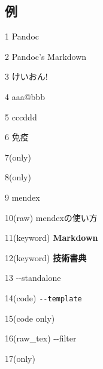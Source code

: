 \documentclass[
  a4paper,
  lualatex,
  ja=standard]{bxjsarticle}
\begin{document}
\hypertarget{ux4f8b}{%
\subsection{例}\label{ux4f8b}}

1 {Pandoc}

2 {Pandoc's Markdown}

3 {けいおん!}

4 {aaa@bbb}

5 {ccc\textbar ddd}

6 {免疫}

7(only) {}

8(only) {}

9 {mendex}

10(raw) mendexの使い方{}

11(keyword) {\textbf{Markdown}}

12(keyword) {\textbf{技術書典}}

13 {-\/-standalone}

14(code) {\texttt{-\/-template}}

15(code only) {}

16(raw\_tex) -\/-filter

17(only)



\printindex
\end{document}
